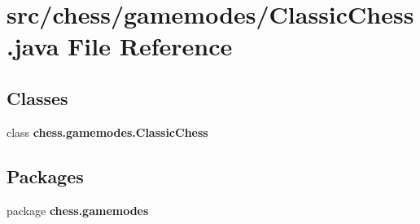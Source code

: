 \section{src/chess/gamemodes/\+Classic\+Chess.java File Reference}
\label{_classic_chess_8java}
\subsection*{Classes}
\begin{DoxyCompactItemize}
\item 
class {\bf chess.\+gamemodes.\+Classic\+Chess}
\end{DoxyCompactItemize}
\subsection*{Packages}
\begin{DoxyCompactItemize}
\item 
package {\bf chess.\+gamemodes}
\end{DoxyCompactItemize}

